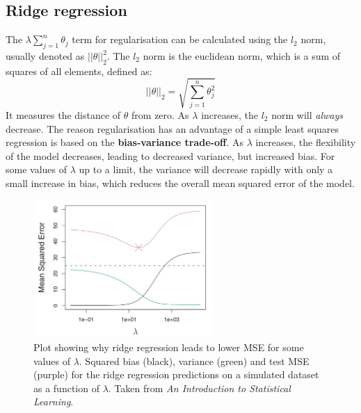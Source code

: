 \documentclass[CS5104-Notes.tex]{subfiles}
\begin{document}
\subsection{Ridge regression}
The $\lambda \sum_{j=1}^{n}\theta_{j}$ term for regularisation can be calculated using the $l_{2}$ norm, usually denoted as $||\theta||_{2}^{2}$. The $l_{2}$ norm is the euclidean norm, which is a sum of squares of all elements, defined as:
\begin{equation}
||\theta||_{2} = \sqrt{\sum_{j=1}^{n}\theta_{j}^2}
\end{equation}
It measures the distance of $\theta$ from zero. As $\lambda$ increases, the $l_{2}$ norm will \textit{always} decrease. The reason regularisation has an advantage of a simple least squares regression is based on the \textbf{bias-variance trade-off}. As $\lambda$ increases, the flexibility of the model decreases, leading to decreased variance, but increased bias. For some values of $\lambda$ up to a limit, the variance will decrease rapidly with only a small increase in bias, which reduces the overall mean squared error of the model. 
\begin{figure}[H]
\centering
\includegraphics[width=0.6\textwidth, keepaspectratio]{imgs/ridge-regression.png}
\caption{Plot showing why ridge regression leads to lower MSE for some values of $\lambda$. Squared bias (black), variance (green) and test MSE (purple) for the ridge regression predictions on a simulated dataset as a function of $\lambda$. Taken from \textit{An Introduction to Statistical Learning}.}
\end{figure}
\end{document}
